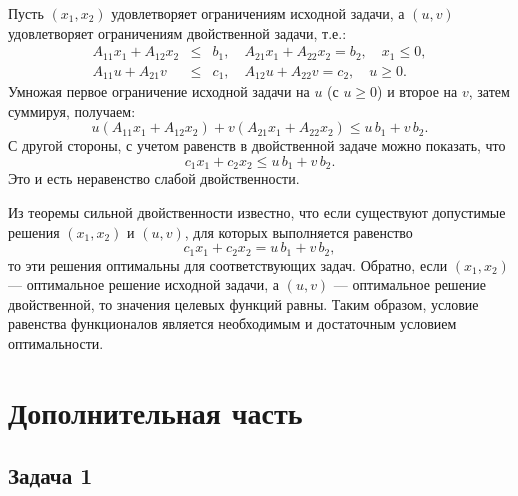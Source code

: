 \documentclass[a4paper,12pt]{article}
\begin{document}
	\medskip
	
	Пусть $(x_1,x_2)$ удовлетворяет ограничениям исходной задачи, а $(u,v)$ удовлетворяет ограничениям двойственной задачи, т.е.:
	\[
	\begin{array}{rcl}
		A_{11}x_1+A_{12}x_2 &\le& b_1,\quad A_{21}x_1+A_{22}x_2 = b_2,\quad x_1\le 0,\\[1mm]
		A_{11}u+A_{21}v &\le& c_1,\quad A_{12}u+A_{22}v = c_2,\quad u\ge0.
	\end{array}
	\]
	Умножая первое ограничение исходной задачи на $u$ (с $u\ge0$) и второе на $v$, затем суммируя, получаем:
	\[
	u(A_{11}x_1+A_{12}x_2) + v(A_{21}x_1+A_{22}x_2) \le u\,b_1 + v\,b_2.
	\]
	С другой стороны, с учетом равенств в двойственной задаче можно показать, что
	\[
	c_1x_1+c_2x_2 \le u\,b_1+v\,b_2.
	\]
	Это и есть неравенство слабой двойственности.
	
	\medskip
	
	Из теоремы сильной двойственности известно, что если существуют допустимые решения $(x_1,x_2)$ и $(u,v)$, для которых выполняется равенство
	\[
	c_1x_1+c_2x_2 = u\,b_1+v\,b_2,
	\]
	то эти решения оптимальны для соответствующих задач. Обратно, если $(x_1,x_2)$ --- оптимальное решение исходной задачи, а $(u,v)$ --- оптимальное решение двойственной, то значения целевых функций равны. Таким образом, условие равенства функционалов является необходимым и достаточным условием оптимальности.
	
	\newpage
	
	\section*{Дополнительная часть}
	
	\subsection*{Задача 1}
	
	
	\textbf{}
	
\end{document}
